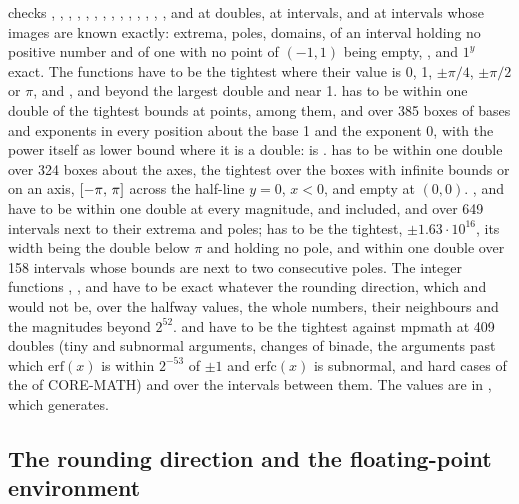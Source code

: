 \medskip
{} checks , , , ,
, , , , , ,
, , , ,  and
 at doubles, at intervals, and at intervals whose images are known
exactly: extrema, poles, domains,  of an interval holding no
positive number and  of one with no point of $(-1, 1)$ being
empty, ,  and $1^y$ exact. The functions have to
be the tightest where their value is 0, 1, $\pm\pi/4$, $\pm\pi/2$ or $\pi$,
and ,  and  beyond the largest double and
near 1.  has to be within one double of the tightest bounds
at points,  among them, and over 385 boxes of bases
and exponents in every position about the base 1 and the exponent 0, with
the power itself as lower bound where it is a double:  is
\code{[2]}.  has to be within one double over 324 boxes about
the axes, the tightest over the boxes with infinite bounds or on an axis,
$[-\pi,\,\pi]$ across the half-line $y=0$, $x<0$, and empty at $(0, 0)$.
,  and  have to be within one double at every
magnitude,  and  included, and over
649 intervals next to their extrema and poles; 
has to be the tightest, $\pm1.63\cdot10^{16}$, its width being the double
below $\pi$ and holding no pole, and  within one double over 158
intervals whose bounds are next to two consecutive poles.\newinvfive{}
The integer functions
, ,  and
 have to be exact whatever the rounding
direction, which  and  would not be,
over the halfway values, the whole numbers, their neighbours and the
magnitudes beyond $2^{52}$.  and  have to be the
tightest against mpmath at 409 doubles (tiny and subnormal arguments,
changes of binade, the arguments past which $\mathrm{erf}(x)$ is within
$2^{-53}$ of $\pm1$ and $\mathrm{erfc}(x)$ is subnormal, and hard cases of
the  of CORE-MATH) and over the intervals between
them.\newinvfive{} The values are in , which
 generates.

\subsection{The rounding direction and the floating-point \texorpdfstring{\mbox{environment}}{environment}}

